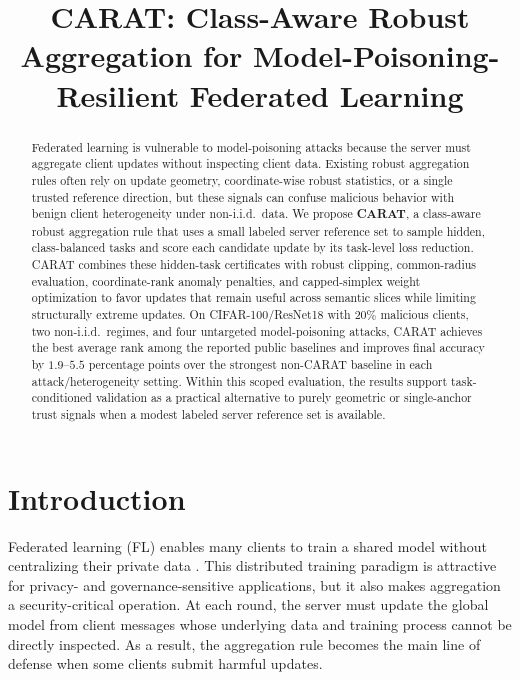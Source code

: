\documentclass{article}
\title{CARAT: Class-Aware Robust Aggregation for Model-Poisoning-Resilient Federated Learning}
\begin{document}
\maketitle

\begin{abstract}
Federated learning is vulnerable to model-poisoning attacks because the server must aggregate client updates without inspecting client data. Existing robust aggregation rules often rely on update geometry, coordinate-wise robust statistics, or a single trusted reference direction, but these signals can confuse malicious behavior with benign client heterogeneity under non-i.i.d.\ data. We propose \textbf{CARAT}, a class-aware robust aggregation rule that uses a small labeled server reference set to sample hidden, class-balanced tasks and score each candidate update by its task-level loss reduction. CARAT combines these hidden-task certificates with robust clipping, common-radius evaluation, coordinate-rank anomaly penalties, and capped-simplex weight optimization to favor updates that remain useful across semantic slices while limiting structurally extreme updates. On CIFAR-100/ResNet18 with $20\%$ malicious clients, two non-i.i.d.\ regimes, and four untargeted model-poisoning attacks, CARAT achieves the best average rank among the reported public baselines and improves final accuracy by $1.9$--$5.5$ percentage points over the strongest non-CARAT baseline in each attack/heterogeneity setting. Within this scoped evaluation, the results support task-conditioned validation as a practical alternative to purely geometric or single-anchor trust signals when a modest labeled server reference set is available.
\end{abstract}

\section{Introduction}
\label{sec:introduction}

Federated learning (FL) enables many clients to train a shared model without centralizing their private data \citep{mcmahan2017fedavg,bonawitz2017secureagg,kairouz2021federated}. This distributed training paradigm is attractive for privacy- and governance-sensitive applications, but it also makes aggregation a security-critical operation. At each round, the server must update the global model from client messages whose underlying data and training process cannot be directly inspected. As a result, the aggregation rule becomes the main line of defense when some clients submit harmful updates.
\end{document}
